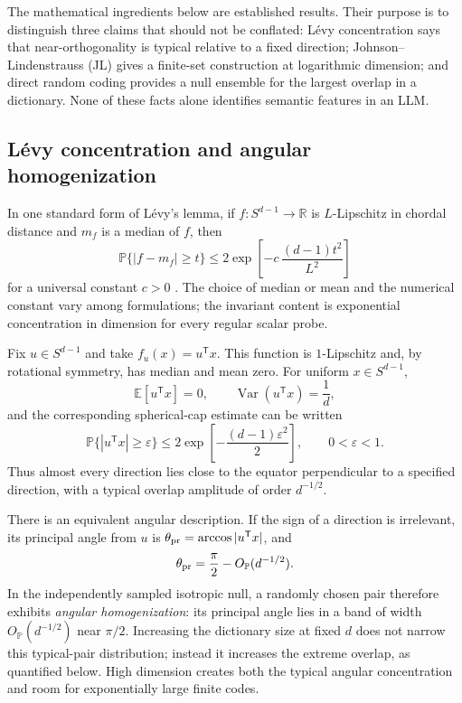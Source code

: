 \documentclass[
  aps,
  reprint,
  superscriptaddress,
  floatfix,
  nofootinbib,
  longbibliography
]{revtex4-2}
\newcommand{\R}{\mathbb{R}}
\newcommand{\E}{\mathbb{E}}
\newcommand{\Prob}{\mathbb{P}}
\newcommand{\Sph}[1]{S^{#1}}
\newcommand{\T}{^{\mathsf{T}}}
\DeclareMathOperator{\Var}{Var}
\begin{document}
The mathematical ingredients below are established results.  Their purpose
is to distinguish three claims that should not be conflated: L\'evy
concentration says that near-orthogonality is typical relative to a fixed
direction; Johnson--Lindenstrauss (JL) gives a finite-set construction at
logarithmic dimension; and direct random coding provides a null ensemble for
the largest overlap in a dictionary.  None of these facts alone identifies
semantic features in an LLM.

\subsection{L\'evy concentration and angular homogenization}
\label{sec:levy}

In one standard form of L\'evy's lemma, if
$f:\Sph{d-1}\rightarrow\R$ is $L$-Lipschitz in chordal distance and $m_f$ is
a median of $f$, then
\begin{equation}
\label{eq:levy-general}
\Prob\{|f-m_f|\geq t\}
\leq
2\exp\!\left[-c\,\frac{(d-1)t^2}{L^2}\right]
\end{equation}
for a universal constant $c>0$
\cite{ledoux2001concentration,milman1986asymptotic}.  The choice of median or
mean and the numerical constant vary among formulations; the invariant
content is exponential concentration in dimension for every regular scalar
probe.

Fix $u\in\Sph{d-1}$ and take $f_u(x)=u\T x$.  This function is
$1$-Lipschitz and, by rotational symmetry, has median and mean zero.  For
uniform $x\in\Sph{d-1}$,
\begin{equation}
\label{eq:moments}
\E[u\T x]=0,
\qquad
\Var(u\T x)=\frac{1}{d},
\end{equation}
and the corresponding spherical-cap estimate can be written
\begin{equation}
\label{eq:overlap}
\Prob\{|u\T x|\geq\varepsilon\}
\leq
2\exp\!\left[-\frac{(d-1)\varepsilon^2}{2}\right],
\qquad 0<\varepsilon<1.
\end{equation}
Thus almost every direction lies close to the equator perpendicular to a
specified direction, with a typical overlap amplitude of order
$d^{-1/2}$.

There is an equivalent angular description.  If the sign of a direction is
irrelevant, its principal angle from $u$ is
$\theta_{\rm pr}=\arccos|u\T x|$, and
\begin{equation}
\label{eq:angular-homogenization}
\theta_{\rm pr}
=\frac{\pi}{2}-O_{\Prob}(d^{-1/2}).
\end{equation}
In the independently sampled isotropic null, a randomly chosen pair therefore
exhibits \emph{angular homogenization}: its principal angle lies in a band of
width $O_{\Prob}(d^{-1/2})$ near $\pi/2$.  Increasing the dictionary size at
fixed $d$ does not narrow this typical-pair distribution; instead it increases
the extreme overlap, as quantified below.  High dimension creates both the
typical angular concentration and room for exponentially large finite codes.
\end{document}
